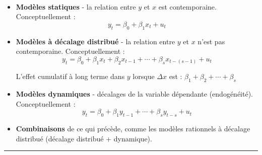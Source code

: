 	\begin{f}{\ }
		
	\begin{itemize}[leftmargin=*]
		\item \textbf{Modèles statiques} - la relation entre \(y\) et \(x\) est contemporaine. Conceptuellement :
\[y_{t} = \beta_{0} + \beta_{1} x_{t} + u_{t}\]
		
		\item \textbf{Modèles à décalage distribué} - la relation entre \(y\) et \(x\) n'est pas contemporaine. Conceptuellement :
\[y_{t} = \beta_{0} + \beta_{1} x_{t} + \beta_{2} x_{t - 1} + \cdots + \beta_{s} x_{t - (s - 1)} + u_{t}\]
		
		L'effet cumulatif à long terme dans \(y\) lorsque \(\Delta x\) est :
			\(\beta_{1} + \beta_{2} + \cdots + \beta_{s}\)
		
		\item \textbf{Modèles dynamiques} - décalages de la variable dépendante (endogénéité). Conceptuellement :
\[y_{t} = \beta_{0} + \beta_{1} y_{t - 1} + \cdots + \beta_{s} y_{t - s} + u_{t}\]
		
		\item \textbf{Combinaisons} de ce qui précède, comme les modèles rationnels à décalage distribué (décalage distribué + dynamique).
	\end{itemize}	

\end{f} 
 \hrule 
 
